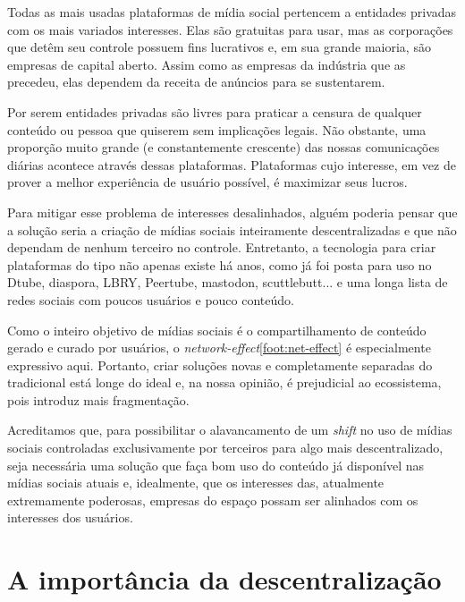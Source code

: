 Todas as mais usadas plataformas de mídia social pertencem a entidades privadas com os mais variados interesses.
Elas são gratuitas para usar, mas as corporações que detêm seu controle possuem fins lucrativos e, em sua grande maioria, são empresas de capital aberto.
Assim como as empresas da indústria que as precedeu, elas dependem da receita de anúncios para se sustentarem.

Por serem entidades privadas são livres para praticar a censura de qualquer conteúdo ou pessoa que quiserem sem implicações legais.
Não obstante, uma proporção muito grande (e constantemente crescente) das nossas comunicações diárias acontece através dessas plataformas.
Plataformas cujo interesse, em vez de prover a melhor experiência de usuário possível, é maximizar seus lucros.

Para mitigar esse problema de interesses desalinhados, alguém poderia pensar que a solução seria a criação de mídias sociais inteiramente descentralizadas e que não dependam de nenhum terceiro no controle.
Entretanto, a tecnologia para criar plataformas do tipo não apenas existe há anos, como já foi posta para uso no Dtube, diaspora, LBRY, Peertube, mastodon, scuttlebutt... e uma longa lista de redes sociais com poucos usuários e pouco conteúdo.

Como o inteiro objetivo de mídias sociais é o compartilhamento de conteúdo gerado e curado por usuários, o \textit{network-effect}\ref{foot:net-effect} é especialmente expressivo aqui.
Portanto, criar soluções novas e completamente separadas do tradicional está longe do ideal e, na nossa opinião, é prejudicial ao ecossistema, pois introduz mais fragmentação.

Acreditamos que, para possibilitar o alavancamento de um \textit{shift} no uso de mídias sociais controladas exclusivamente por terceiros para algo mais descentralizado, seja necessária uma solução que faça bom uso do conteúdo já disponível nas mídias sociais atuais e, idealmente, que os interesses das, atualmente extremamente poderosas, empresas do espaço possam ser alinhados com os interesses dos usuários.

\section{A importância da descentralização}

